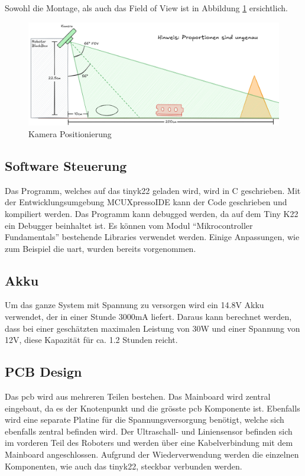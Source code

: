 Sowohl die Montage, als auch das Field of View ist in Abbildung \ref{fig:camera-position-concept} ersichtlich.

\begin{figure}[H]
    \centering
    \includegraphics[width=1\linewidth]{assets//informatik-prototyp//camera/camera_position.png}
    \caption{Kamera Positionierung}
    \label{fig:camera-position-concept}
\end{figure}



\subsection{Software Steuerung}


Das Programm, welches auf das \gls{tinyk22} geladen wird, wird in C geschrieben. Mit der Entwicklungsumgebung MCUXpressoIDE kann der Code geschrieben und kompiliert werden. Das Programm kann debugged werden, da auf dem Tiny K22 ein Debugger beinhaltet ist. Es können vom Modul ``Mikrocontroller Fundamentals'' bestehende Libraries verwendet werden. Einige Anpassungen, wie zum Beispiel die \acrshort{uart}, wurden bereits vorgenommen.

\subsection{Akku}

Um das ganze System mit Spannung zu versorgen wird ein 14.8V Akku verwendet, der in einer Stunde 3000mA liefert. Daraus kann berechnet werden, dass bei einer geschätzten maximalen Leistung von 30W und einer Spannung von 12V, diese Kapazität für ca. 1.2 Stunden reicht.  

\subsection{PCB Design}

Das \acrshort{pcb} wird aus mehreren Teilen bestehen. Das Mainboard wird zentral eingebaut, da es der Knotenpunkt und die grösste \acrshort{pcb} Komponente ist. Ebenfalls wird eine separate Platine für die Spannungsversorgung benötigt, welche sich ebenfalls zentral befinden wird. Der Ultraschall- und Liniensensor befinden sich im vorderen Teil des Roboters und werden über eine Kabelverbindung mit dem Mainboard angeschlossen. Aufgrund der Wiederverwendung werden die einzelnen Komponenten, wie auch das \gls{tinyk22}, steckbar verbunden werden.

